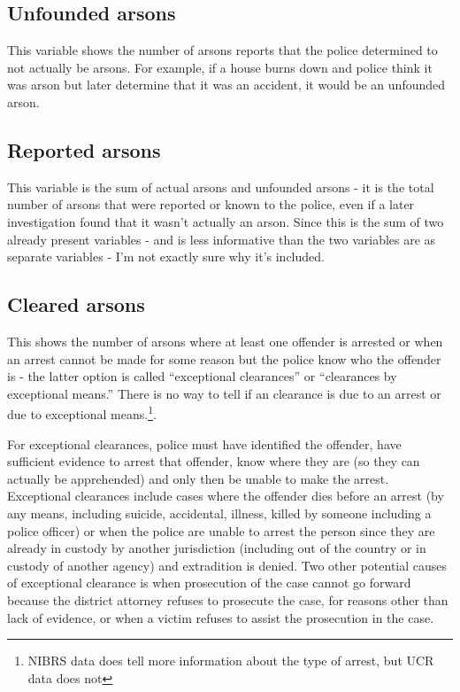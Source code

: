 \documentclass[
  12pt,
  openany]{book}
\begin{document}
\hypertarget{unfounded-arsons}{%
\subsection{Unfounded arsons}\label{unfounded-arsons}}

This variable shows the number of arsons reports that the police determined to not actually be arsons. For example, if a house burns down and police think it was arson but later determine that it was an accident, it would be an unfounded arson.

\hypertarget{reported-arsons}{%
\subsection{Reported arsons}\label{reported-arsons}}

This variable is the sum of actual arsons and unfounded arsons - it is the total number of arsons that were reported or known to the police, even if a later investigation found that it wasn't actually an arson. Since this is the sum of two already present variables - and is less informative than the two variables are as separate variables - I'm not exactly sure why it's included.

\hypertarget{cleared-arsons}{%
\subsection{Cleared arsons}\label{cleared-arsons}}

This shows the number of arsons where at least one offender is arrested or when an arrest cannot be made for some reason but the police know who the offender is - the latter option is called ``exceptional clearances'' or ``clearances by exceptional means.'' There is no way to tell if an clearance is due to an arrest or due to exceptional means.\footnote{NIBRS data does tell more information about the type of arrest, but UCR data does not}.

For exceptional clearances, police must have identified the offender, have sufficient evidence to arrest that offender, know where they are (so they can actually be apprehended) and only then be unable to make the arrest. Exceptional clearances include cases where the offender dies before an arrest (by any means, including suicide, accidental, illness, killed by someone including a police officer) or when the police are unable to arrest the person since they are already in custody by another jurisdiction (including out of the country or in custody of another agency) and extradition is denied. Two other potential causes of exceptional clearance is when prosecution of the case cannot go forward because the district attorney refuses to prosecute the case, for reasons other than lack of evidence, or when a victim refuses to assist the prosecution in the case.
\end{document}
